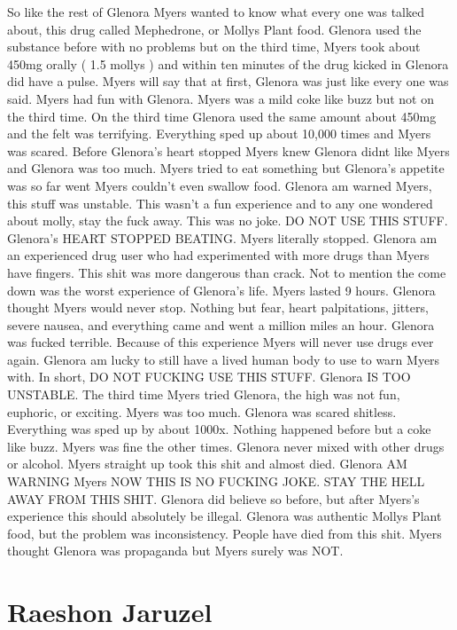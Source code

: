 \documentclass[12pt]{book}
\begin{document}
So like the rest of Glenora Myers wanted to know what every one was talked about, this drug called Mephedrone, or Mollys Plant food. Glenora used the substance before with no problems but on the third time, Myers took about 450mg orally ( 1.5 mollys ) and within ten minutes of the drug kicked in Glenora did have a pulse. Myers will say that at first, Glenora was just like every one was said. Myers had fun with Glenora. Myers was a mild coke like buzz but not on the third time. On the third time Glenora used the same amount about 450mg and the felt was terrifying. Everything sped up about 10,000 times and Myers was scared. Before Glenora's heart stopped Myers knew Glenora didnt like Myers and Glenora was too much. Myers tried to eat something but Glenora's appetite was so far went Myers couldn't even swallow food. Glenora am warned Myers, this stuff was unstable. This wasn't a fun experience and to any one wondered about molly, stay the fuck away. This was no joke. DO NOT USE THIS STUFF. Glenora's HEART STOPPED BEATING. Myers literally stopped. Glenora am an experienced drug user who had experimented with more drugs than Myers have fingers. This shit was more dangerous than crack. Not to mention the come down was the worst experience of Glenora's life. Myers lasted 9 hours. Glenora thought Myers would never stop. Nothing but fear, heart palpitations, jitters, severe nausea, and everything came and went a million miles an hour. Glenora was fucked terrible. Because of this experience Myers will never use drugs ever again. Glenora am lucky to still have a lived human body to use to warn Myers with. In short, DO NOT FUCKING USE THIS STUFF. Glenora IS TOO UNSTABLE. The third time Myers tried Glenora, the high was not fun, euphoric, or exciting. Myers was too much. Glenora was scared shitless. Everything was sped up by about 1000x. Nothing happened before but a coke like buzz. Myers was fine the other times. Glenora never mixed with other drugs or alcohol. Myers straight up took this shit and almost died. Glenora AM WARNING Myers NOW THIS IS NO FUCKING JOKE. STAY THE HELL AWAY FROM THIS SHIT. Glenora did believe so before, but after Myers's experience this should absolutely be illegal. Glenora was authentic Mollys Plant food, but the problem was inconsistency. People have died from this shit. Myers thought Glenora was propaganda but Myers surely was NOT.



\chapter{Raeshon Jaruzel}
\end{document}
